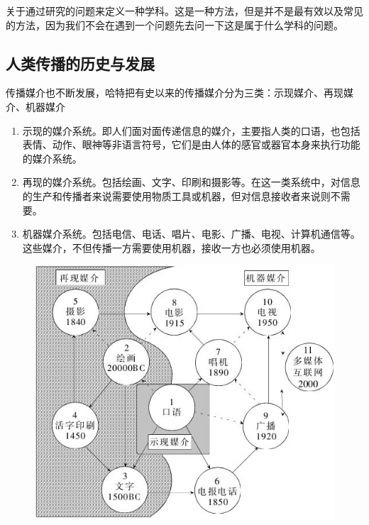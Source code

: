 \documentclass[UTF8,12pt]{ctexart}
\numberwithin{equation}{section} %
\numberwithin{figure}{section}
\numberwithin{table}{section}
\begin{document}
	关于通过研究的问题来定义一种学科。这是一种方法，但是并不是最有效以及常见的方法，因为我们不会在遇到一个问题先去问一下这是属于什么学科的问题。
	
	\subsection{人类传播的历史与发展}
	传播媒介也不断发展，哈特把有史以来的传播媒介分为三类：示现媒介、再现媒介、机器媒介
	
	\begin{enumerate}
		\item 示现的媒介系统。即人们面对面传递信息的媒介，主要指人类的口语，也包括表情、动作、眼神等非语言符号，它们是由人体的感官或器官本身来执行功能的媒介系统。
		
		\item 再现的媒介系统。包括绘画、文字、印刷和摄影等。在这一类系统中，对信息的生产和传播者来说需要使用物质工具或机器，但对信息接收者来说则不需要。
		
		\item 机器媒介系统。包括电信、电话、唱片、电影、广播、电视、计算机通信等。这些媒介，不但传播一方需要使用机器，接收一方也必须使用机器。
	\end{enumerate}
	
	\begin{figure}[h]
		\centering
		\includegraphics[width=0.7\linewidth]{history}
		\caption{}
		\label{fig:history}
	\end{figure}
	
	\newpage
\end{document}
